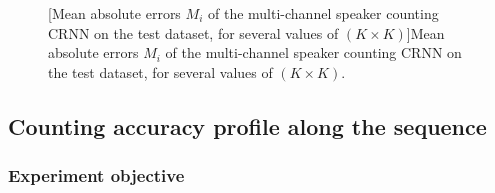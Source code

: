 \begin{figure}[t]
    
    [Mean absolute errors $M_i$ of the multi-channel speaker counting CRNN on the test dataset, for several values of $(K \times K)$]{Mean absolute errors $M_i$ of the multi-channel speaker counting CRNN on the test dataset, for several values of $(K \times K)$.}
    \label{fig:maeKernelSizes}
\end{figure}

\clearpage
\subsection{Counting accuracy profile along the sequence}
\label{ss:accuracyAlongTheSequence}

\subsubsection{Experiment objective}

